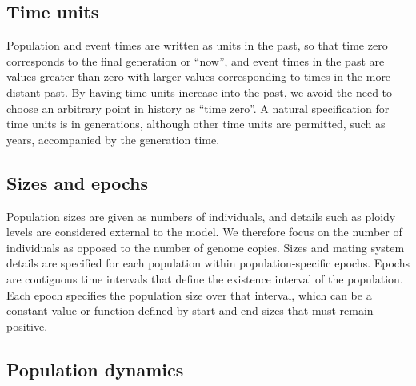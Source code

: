 \documentclass[11pt]{article}
\begin{document}
\subsection{Time units}

Population and event times are written as units in the past, so that time zero
corresponds to the final generation or ``now'', and event times in the past are
values greater than zero with larger values corresponding to times in the more
distant past. By having time units increase into the past, we avoid the need to
choose an arbitrary point in history as ``time zero''. A natural
specification for time units is in generations, although other time units are
permitted, such as years, accompanied by the generation time.

\subsection{Sizes and epochs}

Population sizes are given as numbers of individuals, and details
such as ploidy levels are considered external to the model.
We therefore focus on the number of individuals as opposed
to the number of genome copies.
Sizes and mating system details are specified for each population within
population-specific epochs.
Epochs are contiguous time intervals that define
the existence interval of the population. Each epoch specifies the population size
over that interval, which can be a constant value or function defined by start
and end sizes that must remain positive.

\subsection{Population dynamics}
\end{document}
